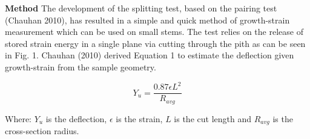 \textbf{Method}
The development of the splitting test, based on the pairing test (Chauhan 2010), has resulted in a simple and quick method of growth-strain measurement which can be used on small stems. The test relies on the release of stored strain energy in a single plane via cutting through the pith as can be seen in Fig. 1. Chauhan (2010) derived Equation 1 to estimate the deflection given growth-strain from the sample geometry.

\begin{equation}
Y_u = \frac{0.87 \epsilon L^2}{R_{avg}}
\end{equation}
  
 Where: \(Y_u\) is the deflection, \(\epsilon\) is the strain, \(L\) is the cut length and \(R_{avg}\) is the cross-section radius. 